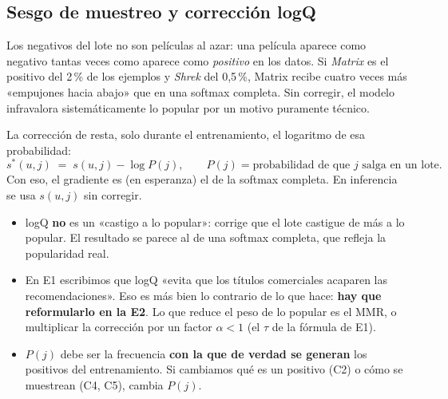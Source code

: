 \documentclass[a4paper,11pt]{article}
\begin{document}
\subsection{Sesgo de muestreo y corrección logQ}\label{sec:logq}
Los negativos del lote no son películas al azar: una película aparece como negativo tantas veces como aparece como
\emph{positivo} en los datos. Si \emph{Matrix} es el positivo del 2\,\% de los ejemplos y \emph{Shrek} del 0,5\,\%, Matrix
recibe cuatro veces más «empujones hacia abajo» que en una softmax completa. Sin corregir, el modelo infravalora
sistemáticamente lo popular por un motivo puramente técnico.

La corrección de \cite{yi2019} resta, solo durante el entrenamiento, el logaritmo de esa probabilidad:
\[
s^{*}(u,j) \;=\; s(u,j) - \log P(j), \qquad P(j)=\text{probabilidad de que $j$ salga en un lote}.
\]
Con eso, el gradiente es (en esperanza) el de la softmax completa. En inferencia se usa $s(u,j)$ sin corregir.

\begin{ojo}
\begin{itemize}[leftmargin=*]
  \item logQ \textbf{no} es un «castigo a lo popular»: corrige que el lote castigue de más a lo popular. El resultado se
        parece al de una softmax completa, que refleja la popularidad real.
  \item En E1 escribimos que logQ «evita que los títulos comerciales acaparen las recomendaciones». Eso es más bien
        lo contrario de lo que hace: \textbf{hay que reformularlo en la E2}. Lo que reduce el peso de lo popular es el
        MMR, o multiplicar la corrección por un factor $\alpha<1$ (el $\tau$ de la fórmula de E1).
  \item $P(j)$ debe ser la frecuencia \textbf{con la que de verdad se generan} los positivos del entrenamiento. Si
        cambiamos qué es un positivo (C2) o cómo se muestrean (C4, C5), cambia $P(j)$.
\end{itemize}
\end{ojo}
\end{document}
